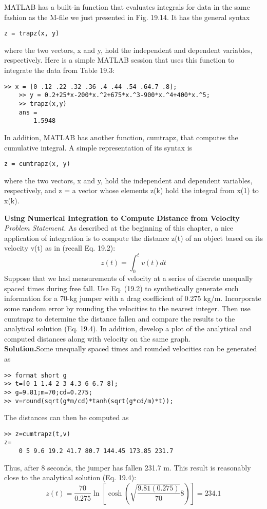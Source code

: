 \documentclass[../main.tex]{subfiles}
\begin{document}
MATLAB has a built-in function that evaluates integrals for data in the same fashion as the
M-file we just presented in Fig. 19.14. It has the general syntax 

\begin{lstlisting}[numbers=none]
	z = trapz(x, y)
\end{lstlisting}
where the two vectors, x and y, hold the independent and dependent variables, respectively.
Here is a simple MATLAB session that uses this function to integrate the data from
Table 19.3:

\begin{lstlisting}[numbers=none]
	>> x = [0 .12 .22 .32 .36 .4 .44 .54 .64.7 .8];
	>> y = 0.2+25*x-200*x.^2+675*x.^3-900*x.^4+400*x.^5;
	>> trapz(x,y)
	ans =
		1.5948
\end{lstlisting}
In addition, MATLAB has another function, cumtrapz, that computes the cumulative
integral. A simple representation of its syntax is 

\begin{lstlisting}[numbers=none]
	z = cumtrapz(x, y)
\end{lstlisting}
where the two vectors, x and y, hold the independent and dependent variables, respectively,
and z = a vector whose elements z(k) hold the integral from x(1) to x(k).

\begin{exmp} \textbf{Using Numerical Integration to Compute Distance from Velocity}
    \noindent\textit{Problem Statement.} As described at the beginning of this chapter, a nice application
	of integration is to compute the distance z(t) of an object based on its velocity v(t) as in
	(recall Eq. 19.2):
$$z(t)=\int_{0}^{t} v(t) d t$$
	Suppose that we had measurements of velocity at a series of discrete unequally spaced times
during free fall. Use Eq. (19.2) to synthetically generate such information for a 70-kg
jumper with a drag coefficient of 0.275 kg/m. Incorporate some random error by rounding
the velocities to the nearest integer. Then use cumtrapz to determine the distance fallen and
compare the results to the analytical solution (Eq. 19.4). In addition, develop a plot of the
analytical and computed distances along with velocity on the same graph.\\
    \noindent \textbf{Solution.}Some unequally spaced times and rounded velocities can be generated as
	\begin{lstlisting}[numbers=none]
>> format short g
>> t=[0 1 1.4 2 3 4.3 6 6.7 8];
>> g=9.81;m=70;cd=0.275;
>> v=round(sqrt(g*m/cd)*tanh(sqrt(g*cd/m)*t));
	\end{lstlisting}
	The distances can then be computed as 
	\begin{lstlisting}[numbers=none]
>> z=cumtrapz(t,v)
z=
	0 5 9.6 19.2 41.7 80.7 144.45 173.85 231.7

	\end{lstlisting}
\end{exmp}
Thus, after 8 seconds, the jumper has fallen 231.7 m. This result is reasonably close to the
analytical solution (Eq. 19.4):
\begin{equation}
	\nonumber
	z(t)=\frac{70}{0.275} \ln \left[\cosh \left(\sqrt{\frac{9.81(0.275)}{70}} 8\right)\right]=234.1
	\end{equation}
\end{document}
